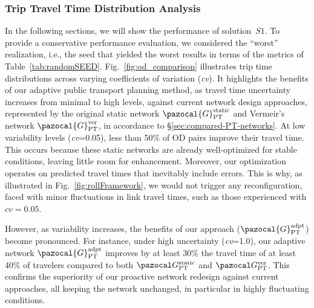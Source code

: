 \documentclass[a4paper,fleqn]{cas-sc}
\begin{document}
\subsubsection{Trip Travel Time Distribution Analysis}

In the following sections, we will show the performance of solution~$S1$. To provide a conservative performance evaluation, we considered the ``worst'' realization, i.e., the seed that yielded the worst results in terms of the metrics of Table~\ref{tab:randomSEED}.
Fig.~\ref{fig:od_comparison} illustrates trip time distributions across varying coefficients of variation (\textit{cv}). It highlights the benefits of our adaptive public transport planning method, as travel time uncertainty increases from minimal to high levels, against current network design approaches, represented by the original static network $\pazocal{G}_{\text{PT}}^{\text{static}}$ and Vermeir's network $\pazocal{G}_{\text{PT}}^{\text{ver}}$, in accordance to \S{}\ref{sec:compared-PT-networks}.
%
At low variability levels (\textit{cv}=0.05), less than 50\% of OD pairs improve their travel time. This occurs because these static networks are already well-optimized for stable conditions, leaving little room for enhancement. 
%
Moreover, our optimization operates on predicted travel times that inevitably include errors. This is why, as illustrated in Fig.~\ref{fig:rollFramework}, we would not trigger any reconfiguration, faced with minor fluctuations in link travel times, such as those experienced with $\textit{cv}=0.05$.

However, as variability increases, the benefits of our approach ($\pazocal{G}_{\text{PT}}^{\text{adpt}}$) become pronounced. For instance, under high uncertainty (\textit{cv}=1.0), our adaptive network $\pazocal{G}_{\text{PT}}^{\text{adpt}}$ improves by at least 30\% the travel time of at least 40\% of travelers compared to both $\pazocal G_\text{PT}^\text{static}$ and $\pazocal G_\text{PT}^\text{ver}$. This confirms the superiority of our proactive network redesign against current approaches, all keeping the network unchanged, in particular in highly fluctuating conditions.
\end{document}
